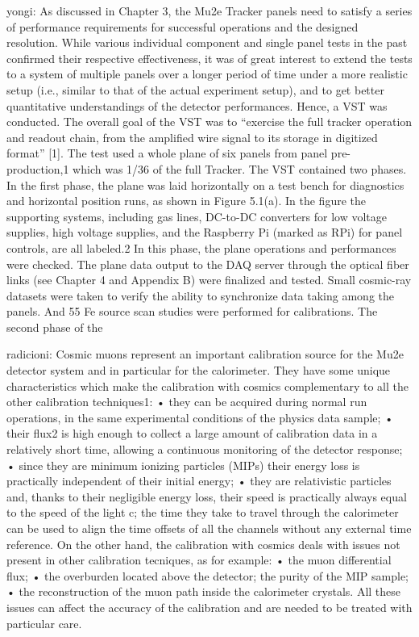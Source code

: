 yongi:
As discussed in Chapter 3, the Mu2e Tracker panels need to satisfy a series of performance
requirements for successful operations and the designed resolution. While various individual
component and single panel tests in the past confirmed their respective effectiveness, it was of great
interest to extend the tests to a system of multiple panels over a longer period of time under a more
realistic setup (i.e., similar to that of the actual experiment setup), and to get better quantitative
understandings of the detector performances. Hence, a VST was conducted.
The overall goal of the VST was to “exercise the full tracker operation and readout chain,
from the amplified wire signal to its storage in digitized format” [1]. The test used a whole plane of
six panels from panel pre-production,1 which was 1/36 of the full Tracker.
The VST contained two phases. In the first phase, the plane was laid horizontally on a
test bench for diagnostics and horizontal position runs, as shown in Figure 5.1(a). In the figure
the supporting systems, including gas lines, DC-to-DC converters for low voltage supplies, high
voltage supplies, and the Raspberry Pi (marked as RPi) for panel controls, are all labeled.2 In this
phase, the plane operations and performances were checked. The plane data output to the DAQ
server through the optical fiber links (see Chapter 4 and Appendix B) were finalized and tested.
Small cosmic-ray datasets were taken to verify the ability to synchronize data taking among the
panels. And 55 Fe source scan studies were performed for calibrations. The second phase of the


radicioni:
Cosmic muons represent an important calibration source for the Mu2e detector
system and in particular for the calorimeter. They have some unique characteristics
which make the calibration with cosmics complementary to all the other calibration
techniques1:
• they can be acquired during normal run operations, in the same experimental
conditions of the physics data sample;
• their flux2
is high enough to collect a large amount of calibration data in a
relatively short time, allowing a continuous monitoring of the detector response;
• since they are minimum ionizing particles (MIPs) their energy loss is practically
independent of their initial energy;
• they are relativistic particles and, thanks to their negligible energy loss, their
speed is practically always equal to the speed of the light c; the time they take
to travel through the calorimeter can be used to align the time offsets of all
the channels without any external time reference.
On the other hand, the calibration with cosmics deals with issues not present in
other calibration tecniques, as for example:
• the muon differential flux;
• the overburden located above the detector;
the purity of the MIP sample;
• the reconstruction of the muon path inside the calorimeter crystals.
All these issues can affect the accuracy of the calibration and are needed to be treated
with particular care.

